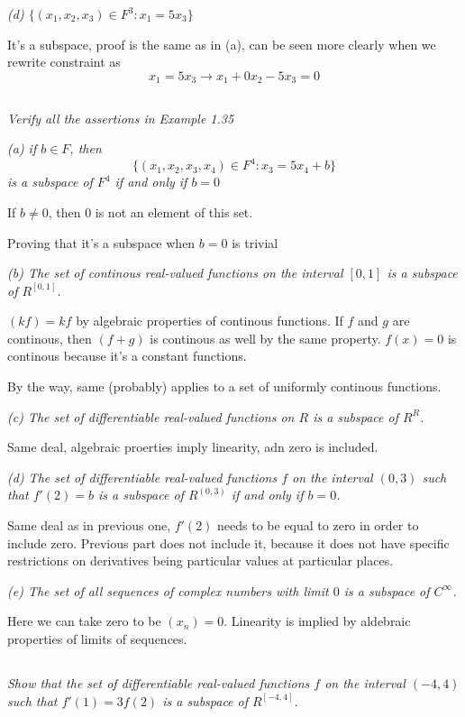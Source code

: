 \documentclass[10pt,oneside,titlepage]{book}
\begin{document}
\textit{(d) $\{(x_1, x_2, x_3) \in F^3: x_1  = 5x_3\}$}

It's a subspace, proof is the same as in (a), can be seen more clearly when we
rewrite constraint as
$$x_1 = 5x_3 \to x_1 + 0x_2 -5x_3 = 0$$

\subsection{}
\textit{Verify all the assertions in Example 1.35}

\textit{(a) if $b \in F$, then}
$$\{(x_1, x_2, x_3, x_4) \in F^4: x_3 = 5x_4 + b\}$$
\textit{is a subspace of $F^4$ if and only if $b = 0$}

If $b \neq 0$, then $0$ is not an element of this set.

Proving that it's a subspace when $b = 0$ is trivial

\textit{(b) The set of continous real-valued functions on the interval $[0, 1]$
  is a subspace of $R^{[0, 1]}$.}

$(kf) = kf$ by algebraic properties of continous functions.
If $f$ and $g$ are continous, then $(f + g)$ is continous as well by the same
property.
$f(x) = 0$ is continous because it's a constant functions.

By the way, same (probably) applies to a set of uniformly continous functions.

\textit{(c) The set of differentiable real-valued functions on $R$ is a
  subspace of $R^R$.}

Same deal, algebraic proerties imply linearity, adn zero is included.

\textit{(d) The set of differentiable real-valued functions $f$ on the
  interval $(0, 3)$ such that $f'(2) = b$ is a subspace of $R^{(0, 3)}$
  if and only if $b = 0$.}

Same deal as in previous one, $f'(2)$ needs to be equal to zero in order
to include zero. Previous part does not include it, because it does not
have specific restrictions on derivatives being particular values at particular places.

\textit{(e) The set of all sequences of complex numbers with limit $0$ is a
  subspace of $C^{\infty}$.}

Here we can take zero to be $(x_n) = 0$. Linearity is implied by aldebraic
properties of limits of sequences.

\subsection{}
\textit{Show that the set of differentiable real-valued functions $f$ on the
  interval $(-4, 4)$ such that $f'(1) = 3f(2)$ is a subspace of $R^{[-4, 4]}$.}
\end{document}
